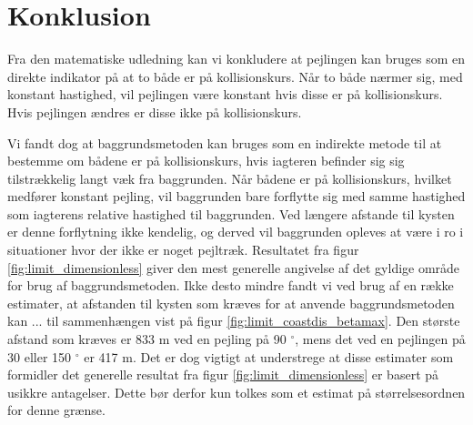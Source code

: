 \documentclass[%
 reprint,
nofootinbib,
aps,
]{revtex4-1}
\begin{document}
\section{Konklusion}
Fra den matematiske udledning kan vi konkludere at pejlingen kan bruges som en direkte indikator på at to både er på kollisionskurs. Når to både nærmer sig, med konstant hastighed, vil pejlingen være konstant hvis disse er på kollisionskurs. Hvis pejlingen ændres er disse ikke på kollisionskurs. \par
Vi fandt dog at baggrundsmetoden kan bruges som en indirekte metode til at bestemme om bådene er på kollisionskurs, hvis iagteren befinder sig sig tilstrækkelig langt væk fra baggrunden. Når bådene er på kollisionskurs, hvilket medfører konstant pejling, vil baggrunden bare forflytte sig med samme hastighed som iagterens relative hastighed til baggrunden. Ved længere afstande til kysten er denne forflytning ikke kendelig, og derved vil baggrunden opleves at være i ro i situationer hvor der ikke er noget pejltræk. Resultatet fra figur \ref{fig:limit_dimensionless} giver den mest generelle angivelse af det gyldige område for brug af baggrundsmetoden. Ikke desto mindre fandt vi ved brug af en række estimater, at afstanden til kysten som kræves for at anvende baggrundsmetoden kan ... til sammenhængen vist på figur \ref{fig:limit_coastdis_betamax}. Den største afstand som kræves er 833 m ved en pejling på 90 $^{\circ}$, mens det ved en pejlingen på 30 eller 150 $^{\circ}$ er 417 m. Det er dog vigtigt at understrege at disse estimater som formidler det generelle resultat fra figur \ref{fig:limit_dimensionless} er basert på usikkre antagelser. Dette bør derfor kun tolkes som et estimat på størrelsesordnen for denne grænse.
\end{document}
